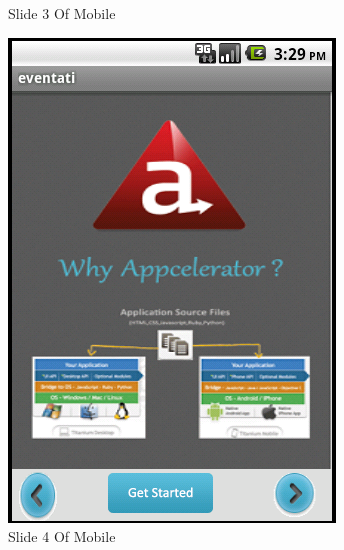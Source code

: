 \documentclass[12pt,a4paper,class,twoside,openany]{report}
\begin{document}
{\begin{figure}
\begin{minipage}[b]{0.5\linewidth}
	\caption{Slide 3  Of Mobile }
     \label{fg:8-15}
	\end{minipage}
	\hspace{0.5cm}
	\begin{minipage}[b]{0.5\linewidth}
	\centering
	\includegraphics[width=\textwidth]{8-16}
	\caption{Slide 4 Of Mobile }
	\label{fg:8-16}
	\end{minipage}
	\end{figure}
\cleardoublepage
}
\end{document}
